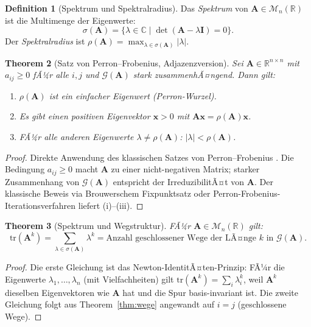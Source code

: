 ﻿\documentclass[12pt, a4paper]{article}
\newtheorem{theorem}{Theorem}[section]
\theoremstyle{definition}
\newtheorem{definition}[theorem]{Definition}
\theoremstyle{remark}
\newcommand{\R}{\mathbb{R}}
\newcommand{\C}{\mathbb{C}}
\newcommand{\vA}{\bm{A}}
\newcommand{\vI}{\bm{I}}
\newcommand{\tr}{\mathrm{tr}}
\newcommand{\spec}{\sigma}
\begin{document}
\begin{definition}[Spektrum und Spektralradius]
Das \emph{Spektrum} von $\vA \in \mathcal{M}_n(\R)$ ist die Multimenge
der Eigenwerte:
\[
  \spec(\vA) = \{\lambda \in \C \mid \det(\vA - \lambda \vI) = 0\}.
\]
Der \emph{Spektralradius} ist $\rho(\vA) = \max_{\lambda \in \spec(\vA)}|\lambda|$.
\end{definition}

\begin{theorem}[Satz von Perron--Frobenius, Adjazenzversion]
\label{thm:pf}
Sei $\vA \in \R^{n \times n}$ mit $a_{ij} \geq 0$ fÃ¼r alle $i,j$
und $\mathcal{G}(\vA)$ stark zusammenhÃ¤ngend. Dann gilt:
\begin{enumerate}[label=(\roman*)]
  \item $\rho(\vA)$ ist ein einfacher Eigenwert (Perron-Wurzel).
  \item Es gibt einen positiven Eigenvektor $\bm{x} > 0$ mit
    $\vA \bm{x} = \rho(\vA) \bm{x}$.
  \item FÃ¼r alle anderen Eigenwerte $\lambda \neq \rho(\vA)$:
    $|\lambda| < \rho(\vA)$.
\end{enumerate}
\end{theorem}

\begin{proof}
Direkte Anwendung des klassischen Satzes von Perron--Frobenius
\citep{horn2013}. Die Bedingung $a_{ij} \geq 0$ macht $\vA$ zu einer
nicht-negativen Matrix; starker Zusammenhang von $\mathcal{G}(\vA)$
entspricht der IrreduzibilitÃ¤t von $\vA$. Der klassische Beweis via
Brouwerschem Fixpunktsatz oder Perron-Frobenius-Iterationsverfahren liefert
(i)--(iii).
\end{proof}

\begin{theorem}[Spektrum und Wegstruktur]
\label{thm:spur}
FÃ¼r $\vA \in \mathcal{M}_n(\R)$ gilt:
\[
  \tr(\vA^k) = \sum_{\lambda \in \spec(\vA)} \lambda^k
  = \text{Anzahl geschlossener Wege der LÃ¤nge } k \text{ in } \mathcal{G}(\vA).
\]
\end{theorem}

\begin{proof}
Die erste Gleichung ist das Newton-IdentitÃ¤ten-Prinzip: FÃ¼r die
Eigenwerte $\lambda_1,\ldots,\lambda_n$ (mit Vielfachheiten) gilt
$\tr(\vA^k) = \sum_i \lambda_i^k$, weil $\vA^k$ dieselben Eigenvektoren
wie $\vA$ hat und die Spur basis-invariant ist. Die zweite Gleichung
folgt aus Theorem~\ref{thm:wege} angewandt auf $i = j$ (geschlossene Wege).
\end{proof}
\end{document}
